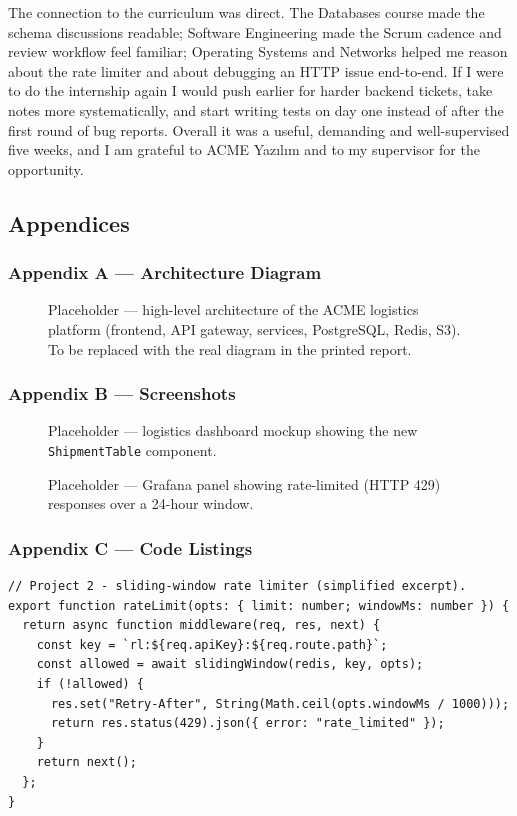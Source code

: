 \documentclass[11pt,a4paper]{article}
\begin{document}
The connection to the curriculum was direct. The Databases course made the schema discussions readable; Software Engineering made the Scrum cadence and review workflow feel familiar; Operating Systems and Networks helped me reason about the rate limiter and about debugging an HTTP issue end-to-end. If I were to do the internship again I would push earlier for harder backend tickets, take notes more systematically, and start writing tests on day one instead of after the first round of bug reports. Overall it was a useful, demanding and well-supervised five weeks, and I am grateful to ACME Yazılım and to my supervisor for the opportunity.

\newpage
\subsection{Appendices}

\subsubsection*{Appendix A — Architecture Diagram}
\begin{figure}[H]
  \centering
  \fbox{\rule{0pt}{6cm}\rule{12cm}{0pt}}
  \caption{Placeholder — high-level architecture of the ACME logistics platform (frontend, API gateway, services, PostgreSQL, Redis, S3). To be replaced with the real diagram in the printed report.}
  \label{fig:architecture}
\end{figure}

\subsubsection*{Appendix B — Screenshots}
\begin{figure}[H]
  \centering
  \fbox{\rule{0pt}{5cm}\rule{10cm}{0pt}}
  \caption{Placeholder — logistics dashboard mockup showing the new \texttt{ShipmentTable} component.}
  \label{fig:screenshot-dashboard}
\end{figure}

\begin{figure}[H]
  \centering
  \fbox{\rule{0pt}{5cm}\rule{10cm}{0pt}}
  \caption{Placeholder — Grafana panel showing rate-limited (HTTP 429) responses over a 24-hour window.}
  \label{fig:screenshot-grafana}
\end{figure}

\subsubsection*{Appendix C — Code Listings}
\begin{verbatim}
// Project 2 - sliding-window rate limiter (simplified excerpt).
export function rateLimit(opts: { limit: number; windowMs: number }) {
  return async function middleware(req, res, next) {
    const key = `rl:${req.apiKey}:${req.route.path}`;
    const allowed = await slidingWindow(redis, key, opts);
    if (!allowed) {
      res.set("Retry-After", String(Math.ceil(opts.windowMs / 1000)));
      return res.status(429).json({ error: "rate_limited" });
    }
    return next();
  };
}
\end{verbatim}
\end{document}
